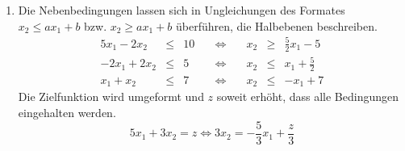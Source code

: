 \documentclass[a4paper]{scrartcl}
\begin{document}
\begin{enumerate}
\begin{enumerate}
\begin{enumerate}[(i)]
                    \item
                        \begin{equation}
                            \begin{gathered}
                                \text{maximiere } x_1 - x_2 - x_3' + x_3'' + 2x_4 \\
                                \text{unter den Nebenbedingungen} \\
                                \syssubstitute{a{x_3'}b{x_3''}}
                                \sysdelim..\systeme[x_1x_2abx_4]{%
                                    -7x_1 +x_2 -4a +4b \leq  2,
                                    3x_1 -x_2 -2a +2b +x_4 \leq 3,
                                    x_2 -2x_4 \leq 7,
                                    -x_2 +2x_4 \leq -7
                                } \\
                                x_1, x_2, x_3', x_3'', x_4 \geq 0
                            \end{gathered}
                        \end{equation}
                \end{enumerate}
            \item
                Die Nebenbedingungen lassen sich in Ungleichungen des Formates
                $x_2 \leq ax_1 + b$ bzw. $x_2 \geq ax_1 + b$ überführen, die
                Halbebenen beschreiben.
                \begin{equation}
                    \begin{alignedat}{7}
                        5x_1 -2x_2 &\leq& 10 & \quad \Leftrightarrow & \quad x_2 &\geq& \frac{5}{2}x_1 -5 \\
                        -2x_1 +2x_2 &\leq& 5 & \quad \Leftrightarrow & \quad x_2 &\leq& x_1 +\frac{5}{2} \\
                        x_1 +x_2 &\leq& 7 & \quad \Leftrightarrow & \quad x_2 &\leq& -x_1 +7
                    \end{alignedat}
                \end{equation}
                Die Zielfunktion wird umgeformt und $z$ soweit erhöht, dass
                alle Bedingungen eingehalten werden.
                \begin{equation}
                    5x_1 + 3x_2 = z \Leftrightarrow 3x_2 = -\frac{5}{3}x_1 + \frac{z}{3}
                \end{equation}
                \begin{center}
                    \begin{tikzpicture}

\end{tikzpicture}
\end{center}
\end{enumerate}
\end{enumerate}
\end{document}
